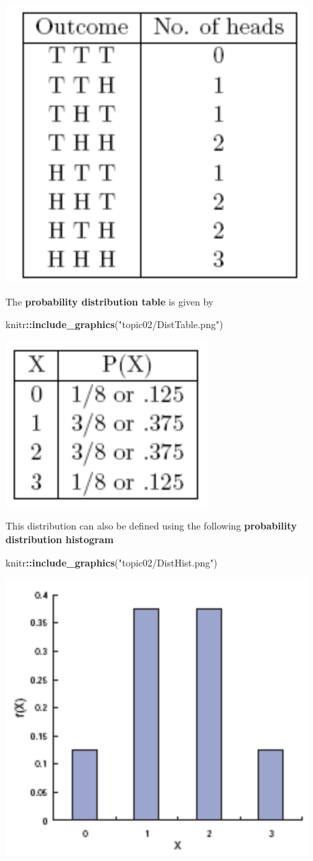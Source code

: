 \documentclass[
]{book}
\newenvironment{Shaded}{\begin{snugshade}}{\end{snugshade}}
\newcommand{\FunctionTok}[1]{\textcolor[rgb]{0.13,0.29,0.53}{\textbf{#1}}}
\newcommand{\NormalTok}[1]{#1}
\newcommand{\SpecialCharTok}[1]{\textcolor[rgb]{0.81,0.36,0.00}{\textbf{#1}}}
\newcommand{\StringTok}[1]{\textcolor[rgb]{0.31,0.60,0.02}{#1}}
\begin{document}
\begin{center}\includegraphics[width=0.3\linewidth]{topic02/SampleSpace} \end{center}

The \textbf{probability distribution table} is given by

\begin{Shaded}
\begin{Highlighting}[]
\NormalTok{knitr}\SpecialCharTok{::}\FunctionTok{include\_graphics}\NormalTok{(}\StringTok{"topic02/DistTable.png"}\NormalTok{)}
\end{Highlighting}
\end{Shaded}

\begin{center}\includegraphics[width=0.3\linewidth]{topic02/DistTable} \end{center}

This distribution can also be defined using the following \textbf{probability distribution histogram}

\begin{Shaded}
\begin{Highlighting}[]
\NormalTok{knitr}\SpecialCharTok{::}\FunctionTok{include\_graphics}\NormalTok{(}\StringTok{"topic02/DistHist.png"}\NormalTok{)}
\end{Highlighting}
\end{Shaded}

\begin{center}\includegraphics[width=0.3\linewidth]{topic02/DistHist} \end{center}
\end{document}
